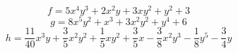 \documentclass[12pt]{article}
\begin{document}
\[
    f = 5x^{4}y^{3} + 2x^{2}y + 3xy^{2} + y^{2} + 3
\]
\[
    g = 8x^{5}y^{2} + x^{3} + 3x^{2}y^{2} + y^{4} + 6
\]
\[
    h = \frac{11}{40} x^{3} y
        + \frac{3}{5} x^{2} y^{2}
        + \frac{1}{5} x y^{2}
        + \frac{3}{5} x
        - \frac{3}{8} x^{2} y^{3}
        - \frac{1}{8} y^{5}
        - \frac{3}{4} y
\]
\end{document}
